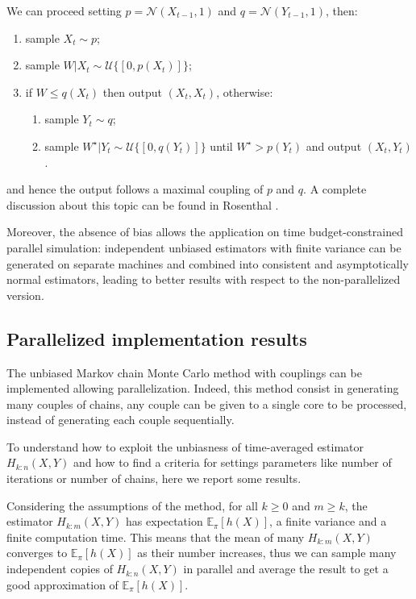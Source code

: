 \documentclass[11pt,a4paper,oneside]{report}
\begin{document}
We can proceed setting $p = \mathcal{N}(X_{t-1},1)$ and $q = \mathcal{N}(Y_{t-1},1)$, then:
\begin{enumerate}
	\item sample $X_t \sim p$;
	\item sample $W|X_t \sim \mathcal{U}\{[0,p(X_t)]\}$;
	\item if $W\leq q(X_t)$ then output $(X_t,X_t)$, otherwise:
	\begin{enumerate}
		\item sample $Y_t \sim q$;
		\item sample $W^\star | Y_t \sim \mathcal{U}\{[0, q(Y_t)]\}$ 
		until $W^\star > p(Y_t)$ and output $(X_t,Y_t)$.
	\end{enumerate}
\end{enumerate}
and hence the output follows a maximal coupling of $p$ and $q$. A complete discussion about this topic can be found in Rosenthal \cite{rosenthal1997faithful}.

Moreover, the absence of bias allows the application on time budget-constrained parallel simulation: independent unbiased estimators with finite variance can be generated on separate machines and combined into consistent and asymptotically normal estimators, leading to better results with respect to the non-parallelized version.

\subsection{Parallelized implementation results}
The unbiased Markov chain Monte Carlo method with couplings can be implemented allowing parallelization. Indeed, this method consist in generating many couples of chains, any couple can be given to a single core to be processed, instead of generating each couple sequentially.

To understand how to exploit the unbiasness of time-averaged estimator $H_{k:n}(X,Y)$ and how to find a criteria for settings parameters like number of iterations or number of chains, here we report some results.

Considering the assumptions of the method, for all $k\geq 0$ and $m \geq k$, the estimator $H_{k:m}(X,Y)$ has expectation $\mathbb{E}_\pi[h(X)]$, a finite variance and a finite computation time. This means that the mean of many $H_{k:m}(X,Y)$ converges to $\mathbb{E}_\pi[h(X)]$ as their number increases, thus we can sample many independent copies of $H_{k:n}(X,Y)$ in parallel and average the result to get a good approximation of $\mathbb{E}_\pi[h(X)]$.
\end{document}
